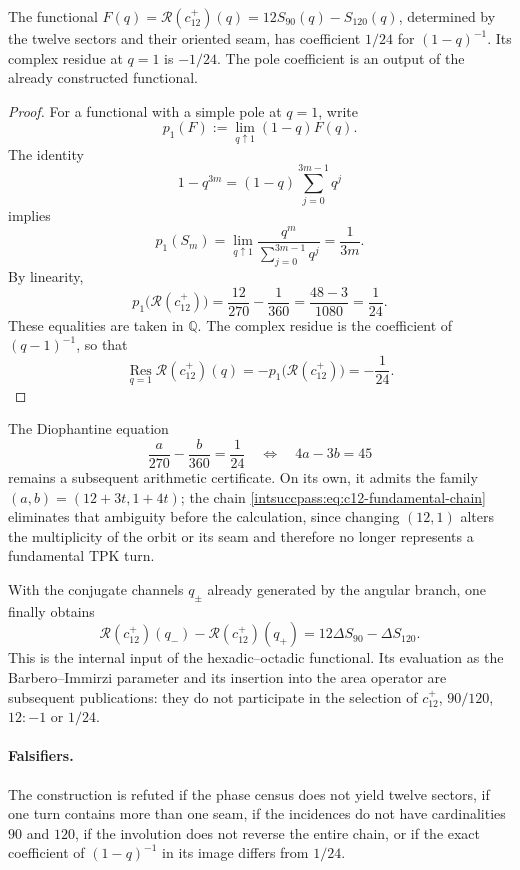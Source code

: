 \begin{theorem}
The functional \(F(q)=\mathscr R(c_{12}^{+})(q)
=12S_{90}(q)-S_{120}(q)\), determined by the twelve sectors
and their oriented seam, has coefficient \(1/24\) for
\((1-q)^{-1}\). Its complex residue at \(q=1\) is \(-1/24\).
The pole coefficient is an output of the already constructed functional.
\end{theorem}

\begin{proof}
For a functional with a simple pole at \(q=1\), write
\[
 p_1(F):=\lim_{q\uparrow1}(1-q)F(q).
\]
The identity
\[
 1-q^{3m}=(1-q)\sum_{j=0}^{3m-1}q^j
\]
implies
\[
 p_1(S_m)
 =\lim_{q\uparrow1}\frac{q^m}{\sum_{j=0}^{3m-1}q^j}
 =\frac1{3m}.
\]
By linearity,
\[
 p_1\bigl(\mathscr R(c_{12}^{+})\bigr)
 =\frac{12}{270}-\frac1{360}
 =\frac{48-3}{1080}=\frac1{24}.
\]
These equalities are taken in \(\mathbb Q\). The complex residue
is the coefficient of \((q-1)^{-1}\), so that
\[
 \operatorname*{Res}_{q=1}\mathscr R(c_{12}^{+})(q)
 =-p_1\bigl(\mathscr R(c_{12}^{+})\bigr)=-\frac1{24}.
\]
\end{proof}

The Diophantine equation
\[
 \frac a{270}-\frac b{360}=\frac1{24}
 \quad\Longleftrightarrow\quad
 4a-3b=45
\]
remains a subsequent arithmetic certificate. On its own, it admits the
family \((a,b)=(12+3t,1+4t)\); the chain
\eqref{intsuccpass:eq:c12-fundamental-chain} eliminates that ambiguity before the calculation,
since changing \((12,1)\) alters the multiplicity of the orbit or its seam
and therefore no longer represents a fundamental TPK turn.

With the conjugate channels \(q_\pm\) already generated by the angular branch, one
finally obtains
\[
 \mathscr R(c_{12}^{+})(q_-)-
 \mathscr R(c_{12}^{+})(q_+)
 =12\Delta S_{90}-\Delta S_{120}.
\]
This is the internal input of the hexadic--octadic functional. Its evaluation
as the Barbero--Immirzi parameter and its insertion into the area operator are
subsequent publications: they do not participate in the selection of
\(c_{12}^{+}\), \(90/120\), \(12:-1\) or \(1/24\).

\paragraph{Falsifiers.}
The construction is refuted if the phase census does not yield twelve sectors, if
one turn contains more than one seam, if the incidences do not have
cardinalities \(90\) and \(120\), if the involution does not reverse the entire chain,
or if the exact coefficient of \((1-q)^{-1}\) in its image differs from \(1/24\).
